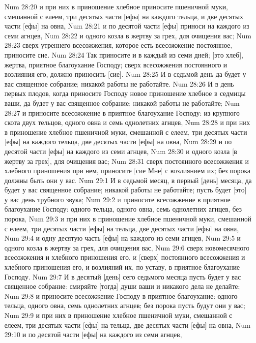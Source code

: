 Num 28:20  и при них в приношение хлебное приносите пшеничной муки, смешанной с елеем, три десятых части [ефы] на каждого тельца, и две десятых части [ефы] на овна,
Num 28:21  и по десятой части [ефы] приноси на каждого из семи агнцев,
Num 28:22  и одного козла в жертву за грех, для очищения вас;
Num 28:23  сверх утреннего всесожжения, которое есть всесожжение постоянное, приносите сие.
Num 28:24  Так приносите и в каждый из семи дней; [это хлеб], жертва, приятное благоухание Господу; сверх всесожжения постоянного и возлияния его, должно приносить [сие].
Num 28:25  И в седьмой день да будет у вас священное собрание; никакой работы не работайте.
Num 28:26  И в день первых плодов, когда приносите Господу новое приношение хлебное в седмицы ваши, да будет у вас священное собрание; никакой работы не работайте;
Num 28:27  и приносите всесожжение в приятное благоухание Господу: из крупного скота двух тельцов, одного овна и семь однолетних агнцев,
Num 28:28  и при них в приношение хлебное пшеничной муки, смешанной с елеем, три десятых части [ефы] на каждого тельца, две десятых части [ефы] на овна,
Num 28:29  и по десятой части [ефы] на каждого из семи агнцев,
Num 28:30  и одного козла [в жертву за грех], для очищения вас;
Num 28:31  сверх постоянного всесожжения и хлебного приношения при нем, приносите [сие Мне] с возлиянием их; без порока должны быть они у вас.
Num 29:1  И в седьмой месяц, в первый [день] месяца, да будет у вас священное собрание; никакой работы не работайте; пусть будет [это] у вас день трубного звука;
Num 29:2  и приносите всесожжение в приятное благоухание Господу: одного тельца, одного овна, семь однолетних агнцев, без порока,
Num 29:3  и при них в приношение хлебное пшеничной муки, смешанной с елеем, три десятых части [ефы] на тельца, две десятых части [ефы] на овна,
Num 29:4  и одну десятую часть [ефы] на каждого из семи агнцев,
Num 29:5  и одного козла в жертву за грех, для очищения вас,
Num 29:6  сверх новомесячного всесожжения и хлебного приношения его, и [сверх] постоянного всесожжения и хлебного приношения его, и возлияний их, по уставу, в приятное благоухание Господу.
Num 29:7  И в десятый [день] сего седьмого месяца пусть будет у вас священное собрание: смиряйте [тогда] души ваши и никакого дела не делайте;
Num 29:8  и приносите всесожжение Господу в приятное благоухание: одного тельца, одного овна, семь однолетних агнцев; без порока пусть будут они у вас;
Num 29:9  и при них в приношение хлебное пшеничной муки, смешанной с елеем, три десятых части [ефы] на тельца, две десятых части [ефы] на овна,
Num 29:10  и по десятой части [ефы] на каждого из семи агнцев,
